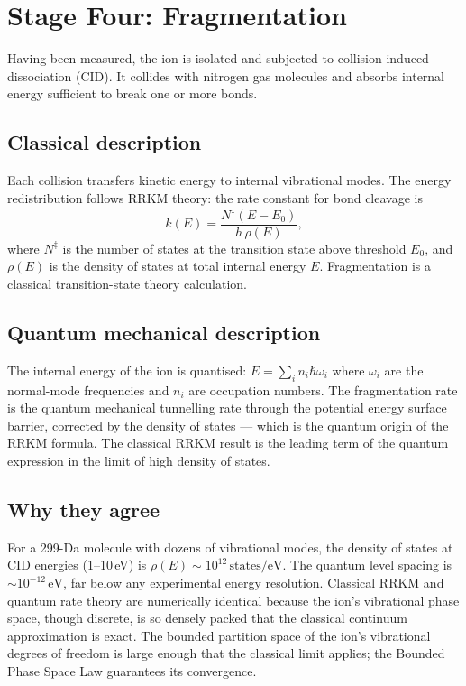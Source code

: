 \section{Stage Four: Fragmentation}
\label{sec:ch1-frag}

Having been measured, the ion is isolated and subjected to collision-induced
dissociation (CID).
It collides with nitrogen gas molecules and absorbs internal energy sufficient
to break one or more bonds.

\subsection*{Classical description}
Each collision transfers kinetic energy to internal vibrational modes.
The energy redistribution follows RRKM theory: the rate constant for bond
cleavage is
\begin{equation}
  k(E) = \frac{N^\ddagger(E - E_0)}{h\,\rho(E)},
\end{equation}
where $N^\ddagger$ is the number of states at the transition state above
threshold $E_0$, and $\rho(E)$ is the density of states at total internal
energy $E$.
Fragmentation is a classical transition-state theory calculation.

\subsection*{Quantum mechanical description}
The internal energy of the ion is quantised: $E = \sum_i n_i \hbar\omega_i$
where $\omega_i$ are the normal-mode frequencies and $n_i$ are occupation
numbers.
The fragmentation rate is the quantum mechanical tunnelling rate through the
potential energy surface barrier, corrected by the density of states --- which
is the quantum origin of the RRKM formula.
The classical RRKM result is the leading term of the quantum expression
in the limit of high density of states.

\subsection*{Why they agree}
For a 299-Da molecule with dozens of vibrational modes, the density of states
at CID energies (1--10\,eV) is $\rho(E) \sim 10^{12}\,\mathrm{states/eV}$.
The quantum level spacing is $\sim 10^{-12}\,\mathrm{eV}$, far below any
experimental energy resolution.
Classical RRKM and quantum rate theory are numerically identical because the
ion's vibrational phase space, though discrete, is so densely packed that the
classical continuum approximation is exact.
The bounded partition space of the ion's vibrational degrees of freedom is
large enough that the classical limit applies; the Bounded Phase Space Law
guarantees its convergence.


